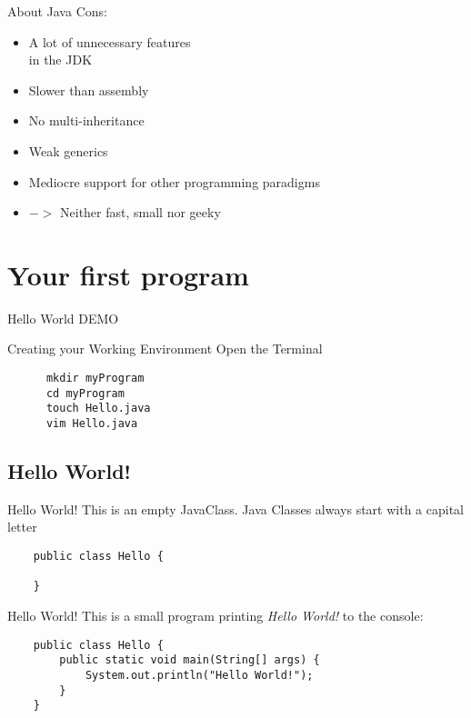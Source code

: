 \begin{frame}{About Java}
	Cons:
	\begin{itemize}
		\item A lot of unnecessary features \\ in the JDK
		\item Slower than assembly
		\item No multi-inheritance
		\item Weak generics
		\item Mediocre support for other programming paradigms
		\item[] $->$ Neither fast, small nor geeky
	\end{itemize}
\end{frame}

\section{Your first program}
\begin{frame}{Hello World}
  DEMO
\end{frame}

\begin{frame}[fragile]{Creating your Working Environment}
  Open the Terminal
  \begin{lstlisting}
      mkdir myProgram
      cd myProgram
      touch Hello.java
      vim Hello.java
  \end{lstlisting}
\end{frame}

\subsection{Hello World!}

\begin{frame}[fragile]{Hello World!}
	This is an empty JavaClass.
  Java Classes always start with a capital letter
	\begin{lstlisting}
	public class Hello {

	}
	\end{lstlisting}
\end{frame}

\begin{frame}[fragile]{Hello World!}
	This is a small program printing \emph{Hello World!} to the console:
	\begin{lstlisting}
	public class Hello {
	    public static void main(String[] args) {
	        System.out.println("Hello World!");
	    }
	}
	\end{lstlisting}
\end{frame}

